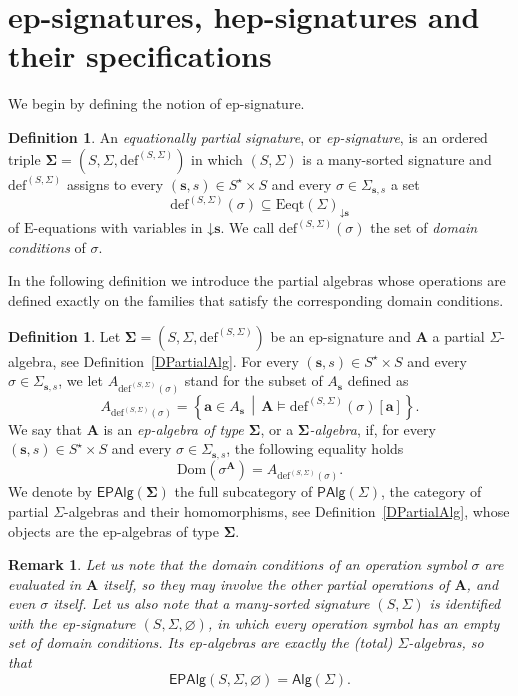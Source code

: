 \documentclass[a4paper, reqno]{amsbook}
\newcommand{\vs}[1]{\mathbin{\downarrow}#1}
\newcommand{\sig}[1]{\mathbf{#1}}             %
\newcommand{\Dom}{\mathrm{Dom}}
\theoremstyle{plain}
\newtheorem{remark}[theorem]{Remark}
\theoremstyle{definition}
\newtheorem{definition}[theorem]{Definition}
\begin{document}
\section{ep-signatures, hep-signatures and their specifications}\label{SEpSig}

We begin by defining the notion of ep-signature.

\begin{definition}\label{DEpSig}
An \emph{equationally partial signature}, or \emph{ep-signature}, is an ordered triple $\sig{\Sigma}=(S,\Sigma,\mathrm{def}^{(S,\Sigma)})$ in which $(S,\Sigma)$ is a many-sorted signature and $\mathrm{def}^{(S,\Sigma)}$ assigns to every $(\mathbf{s},s)\in S^{\star}\times S$ and every $\sigma\in\Sigma_{\mathbf{s},s}$ a set
$$
\mathrm{def}^{(S,\Sigma)}(\sigma)\subseteq\mathrm{Eeqt}(\Sigma)_{\vs{\mathbf{s}}}
$$
of $\mathrm{E}$-equations with variables in $\vs{\mathbf{s}}$.
We call $\mathrm{def}^{(S,\Sigma)}(\sigma)$ the set of \emph{domain conditions} of $\sigma$.
\end{definition}

In the following definition we introduce the partial algebras whose operations are defined exactly on the families that satisfy the corresponding domain conditions.

\begin{definition}\label{DEpAlg}
Let $\sig{\Sigma}=(S,\Sigma,\mathrm{def}^{(S,\Sigma)})$ be an ep-signature and $\mathbf{A}$ a partial $\Sigma$-algebra, see Definition~\ref{DPartialAlg}.
For every $(\mathbf{s},s)\in S^{\star}\times S$ and every $\sigma\in\Sigma_{\mathbf{s},s}$, we let $A_{\mathrm{def}^{(S,\Sigma)}(\sigma)}$ stand for the subset of $A_{\mathbf{s}}$ defined as
$$
A_{\mathrm{def}^{(S,\Sigma)}(\sigma)}=\left\lbrace\mathbf{a}\in A_{\mathbf{s}}\,\middle|\,\mathbf{A}\models\mathrm{def}^{(S,\Sigma)}(\sigma)[\mathbf{a}]\right\rbrace.
$$
We say that $\mathbf{A}$ is an \emph{ep-algebra of type $\sig{\Sigma}$}, or a \emph{$\sig{\Sigma}$-algebra}, if, for every $(\mathbf{s},s)\in S^{\star}\times S$ and every $\sigma\in\Sigma_{\mathbf{s},s}$, the following equality holds
$$
\Dom\left(\sigma^{\mathbf{A}}\right)=A_{\mathrm{def}^{(S,\Sigma)}(\sigma)}.
$$
We denote by $\mathsf{EPAlg}(\sig{\Sigma})$ the full subcategory of $\mathsf{PAlg}(\Sigma)$, the category of partial $\Sigma$-algebras and their homomorphisms, see Definition~\ref{DPartialAlg}, whose objects are the ep-algebras of type $\sig{\Sigma}$.
\end{definition}

\begin{remark}\label{REpAlg}
Let us note that the domain conditions of an operation symbol $\sigma$ are evaluated in $\mathbf{A}$ itself, so they may involve the other partial operations of $\mathbf{A}$, and even $\sigma$ itself.
Let us also note that a many-sorted signature $(S,\Sigma)$ is identified with the ep-signature $(S,\Sigma,\varnothing)$, in which every operation symbol has an empty set of domain conditions.
Its ep-algebras are exactly the (total) $\Sigma$-algebras, so that
$$
\mathsf{EPAlg}(S,\Sigma,\varnothing)=\mathsf{Alg}(\Sigma).
$$
\end{remark}
\end{document}
